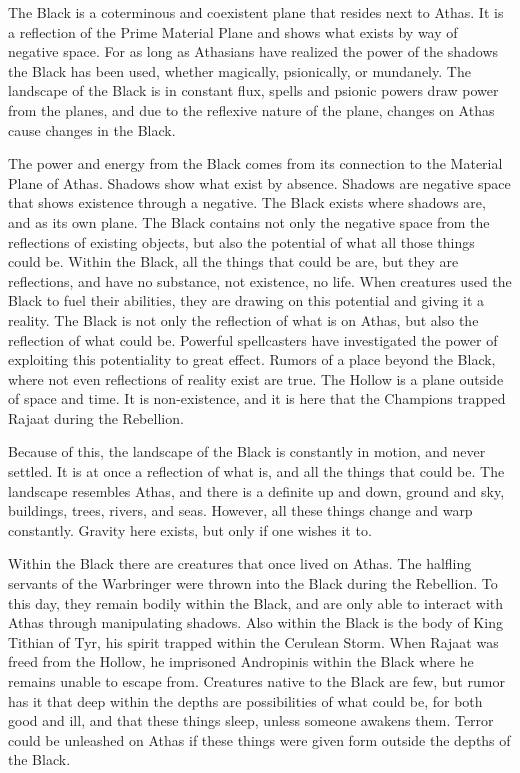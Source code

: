 The Black is a coterminous and coexistent plane that resides next to Athas. It is a reflection of the Prime Material Plane and shows what exists by way of negative space. For as long as Athasians have realized the power of the shadows the Black has been used, whether magically, psionically, or mundanely. The landscape of the Black is in constant flux, spells and psionic powers draw power from the planes, and due to the reflexive nature of the plane, changes on Athas cause changes in the Black.

The power and energy from the Black comes from its connection to the Material Plane of Athas. Shadows show what exist by absence. Shadows are negative space that shows existence through a negative. The Black exists where shadows are, and as its own plane. The Black contains not only the negative space from the reflections of existing objects, but also the potential of what all those things could be. Within the Black, all the things that could be are, but they are reflections, and have no substance, not existence, no life. When creatures used the Black to fuel their abilities, they are drawing on this potential and giving it a reality. The Black is not only the reflection of what is on Athas, but also the reflection of what could be. Powerful spellcasters have investigated the power of exploiting this potentiality to great effect. Rumors of a place beyond the Black, where not even reflections of reality exist are true. The Hollow is a plane outside of space and time. It is non-existence, and it is here that the Champions trapped Rajaat during the Rebellion.

Because of this, the landscape of the Black is constantly in motion, and never settled. It is at once a reflection of what is, and all the things that could be. The landscape resembles Athas, and there is a definite up and down, ground and sky, buildings, trees, rivers, and seas. However, all these things change and warp constantly. Gravity here exists, but only if one wishes it to.

Within the Black there are creatures that once lived on Athas. The halfling servants of the Warbringer were thrown into the Black during the Rebellion. To this day, they remain bodily within the Black, and are only able to interact with Athas through manipulating shadows. Also within the Black is the body of King Tithian of Tyr, his spirit trapped within the Cerulean Storm. When Rajaat was freed from the Hollow, he imprisoned Andropinis within the Black where he remains unable to escape from. Creatures native to the Black are few, but rumor has it that deep within the depths are possibilities of what could be, for both good and ill, and that these things sleep, unless someone awakens them. Terror could be unleashed on Athas if these things were given form outside the depths of the Black.

